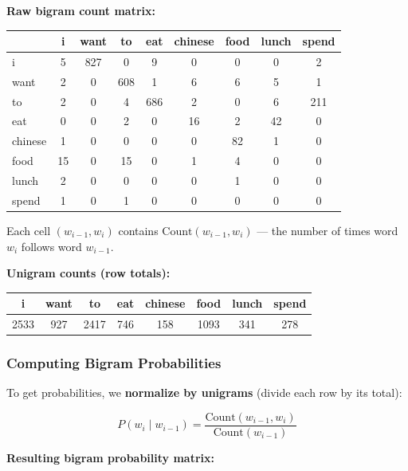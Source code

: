 \documentclass[11pt,a4paper]{article}
\theoremstyle{definition}
\theoremstyle{plain}
\theoremstyle{remark}
\begin{document}
\textbf{Raw bigram count matrix:}

\begin{center}
\begin{tabular}{|l||c|c|c|c|c|c|c|c|}
\hline
 & i & want & to & eat & chinese & food & lunch & spend \\
\hline\hline
i & 5 & 827 & 0 & 9 & 0 & 0 & 0 & 2 \\
want & 2 & 0 & 608 & 1 & 6 & 6 & 5 & 1 \\
to & 2 & 0 & 4 & 686 & 2 & 0 & 6 & 211 \\
eat & 0 & 0 & 2 & 0 & 16 & 2 & 42 & 0 \\
chinese & 1 & 0 & 0 & 0 & 0 & 82 & 1 & 0 \\
food & 15 & 0 & 15 & 0 & 1 & 4 & 0 & 0 \\
lunch & 2 & 0 & 0 & 0 & 0 & 1 & 0 & 0 \\
spend & 1 & 0 & 1 & 0 & 0 & 0 & 0 & 0 \\
\hline
\end{tabular}
\end{center}

Each cell $(w_{i-1}, w_i)$ contains $\text{Count}(w_{i-1}, w_i)$ — the number of times word $w_i$ follows word $w_{i-1}$.

\textbf{Unigram counts (row totals):}

\begin{center}
\begin{tabular}{|c|c|c|c|c|c|c|c|}
\hline
i & want & to & eat & chinese & food & lunch & spend \\
\hline
2533 & 927 & 2417 & 746 & 158 & 1093 & 341 & 278 \\
\hline
\end{tabular}
\end{center}

\subsubsection{Computing Bigram Probabilities}

To get probabilities, we \textbf{normalize by unigrams} (divide each row by its total):

\[
P(w_i \mid w_{i-1}) = \frac{\text{Count}(w_{i-1}, w_i)}{\text{Count}(w_{i-1})}
\]

\textbf{Resulting bigram probability matrix:}
\end{document}
